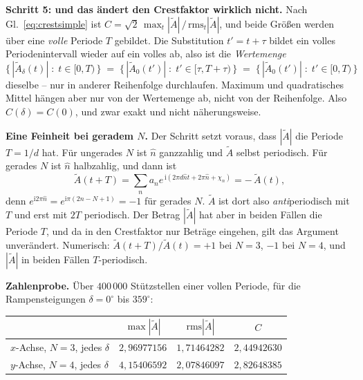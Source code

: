\documentclass[11pt,a4paper]{article}
\newcommand{\crest}{\ensuremath{C}}
\begin{document}
\medskip
\noindent\textbf{Schritt 5: und das ändert den Crestfaktor wirklich nicht.}
Nach Gl.~\eqref{eq:crestsimple} ist
$\crest = \sqrt2\,\max_t|\tilde A|\,/\,\mathrm{rms}_t|\tilde A|$, und beide
Größen werden über eine \emph{volle} Periode $T$ gebildet. Die Substitution
$t' = t+\tau$ bildet ein volles Periodenintervall wieder auf ein volles ab,
also ist die \emph{Wertemenge}
\begin{equation}
  \bigl\{\,|\tilde A_\delta(t)| \;:\; t\in[0,T)\,\bigr\}
  \;=\;
  \bigl\{\,|\tilde A_0(t')| \;:\; t'\in[\tau,T+\tau)\,\bigr\}
  \;=\;
  \bigl\{\,|\tilde A_0(t')| \;:\; t'\in[0,T)\,\bigr\}
\end{equation}
dieselbe -- nur in anderer Reihenfolge durchlaufen. Maximum und quadratisches
Mittel hängen aber nur von der Wertemenge ab, nicht von der Reihenfolge.
Also $\crest(\delta)=\crest(0)$, und zwar exakt und nicht näherungsweise.

\medskip
\noindent\textbf{Eine Feinheit bei geradem \boldmath$N$.} Der Schritt setzt
voraus, dass $|\tilde A|$ die Periode $T=1/d$ hat. Für ungerades $N$ ist
$\hat n$ ganzzahlig und $\tilde A$ selbst periodisch. Für gerades $N$ ist
$\hat n$ halbzahlig, und dann ist
\begin{equation}
  \tilde A(t+T) = \sum_n a_n e^{\,\mathrm{i}(2\pi d\hat n t + 2\pi\hat n + \chi_n)}
                = -\,\tilde A(t) ,
\end{equation}
denn $e^{\mathrm{i}2\pi\hat n} = e^{\mathrm{i}\pi(2n-N+1)} = -1$ für gerades
$N$. $\tilde A$ ist dort also \emph{anti}periodisch mit $T$ und erst mit $2T$
periodisch. Der Betrag $|\tilde A|$ hat aber in beiden Fällen die Periode $T$,
und da in den Crestfaktor nur Beträge eingehen, gilt das Argument unverändert.
Numerisch: $\tilde A(t+T)/\tilde A(t) = +1$ bei $N=3$, $-1$ bei $N=4$, und
$|\tilde A|$ in beiden Fällen $T$-periodisch.

\medskip
\noindent\textbf{Zahlenprobe.} Über $400\,000$ Stützstellen einer vollen
Periode, für die Rampensteigungen $\delta = 0^\circ$ bis $359^\circ$:

\begin{center}
\begin{tabular}{lccc}
  \toprule
  & $\max|\tilde A|$ & $\mathrm{rms}|\tilde A|$ & $\crest$\\
  \midrule
  $x$-Achse, $N=3$, jedes $\delta$ & $2{,}96977156$ & $1{,}71464282$ & $2{,}44942630$\\
  $y$-Achse, $N=4$, jedes $\delta$ & $4{,}15406592$ & $2{,}07846097$ & $2{,}82648385$\\
  \bottomrule
\end{tabular}
\end{center}
\end{document}
